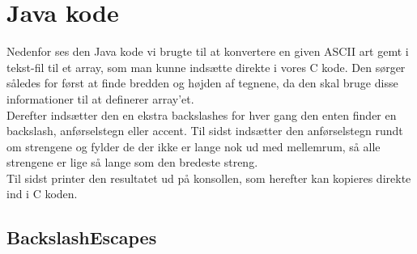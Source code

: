 \chapter{Java kode}

Nedenfor ses den Java kode vi brugte til at konvertere en given ASCII art gemt i tekst-fil til et array, som man kunne indsætte direkte i vores C kode. Den sørger således for først at finde bredden og højden af tegnene, da den skal bruge disse informationer til at definerer array'et. \\
Derefter indsætter den en ekstra backslashes for hver gang den enten finder en backslash, anførselstegn eller accent. Til sidst indsætter den anførselstegn rundt om strengene og fylder de der ikke er lange nok ud med mellemrum, så alle strengene er lige så lange som den bredeste streng. \\
Til sidst printer den resultatet ud på konsollen, som herefter kan kopieres direkte ind i C koden.

\section{BackslashEscapes}
\label{BackslashEscapes}


